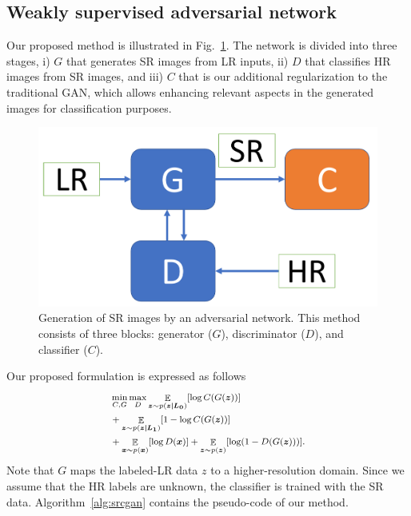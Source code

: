 \documentclass[10pt,twocolumn,letterpaper]{article}
\DeclareMathOperator*{\E}{\mathbb{E}}
\providecommand{\ve}[1]{{\bm{#1}}} %
\begin{document}
\subsection{Weakly supervised adversarial network}

Our proposed method is illustrated in Fig.~\ref{fig:cgan}. The network is divided into three stages, i) $G$ that generates SR images from LR inputs, ii) $D$ that classifies HR images from SR images, and iii) $C$ that is our additional regularization to the traditional GAN, which allows enhancing relevant aspects in the generated images for classification purposes. 

\begin{figure}[h]
\begin{center}
\includegraphics[scale=0.25]{cgan.pdf}
\end{center}
   \caption{Generation of SR images by an adversarial network. This method consists of three blocks: generator ($G$), discriminator ($D$), and classifier ($C$).}
\label{fig:cgan}
\end{figure}

Our proposed formulation is expressed as follows
\begin{eqnarray}
\label{eq:srcgan}
\footnotesize
\begin{aligned}
& \min_{C,G} \max_D \E_{\ve{z} \sim p(\ve{z|L_0})}[\log C(G(\ve{z}))] \\ & +  \E_{\ve{z} \sim p(\ve{z|L_1})}[1-\log C(G(\ve{z}))] \\ & + \E_{\ve{x} \sim p(\ve{x})}[\log D(\ve{x})] + \E_{\ve{z} \sim p(\ve{z})}[\log (1 - D(G(\ve{z})))].
\end{aligned}
\end{eqnarray}
Note that $G$ maps the labeled-LR data $z$ to a higher-resolution domain. Since we assume that the HR labels are unknown, the classifier is trained with the SR data. Algorithm~\ref{alg:srcgan} contains the pseudo-code of our method.
\end{document}
